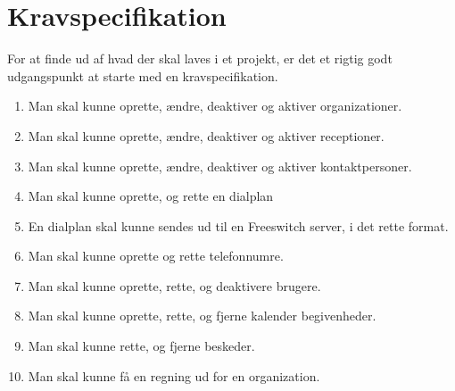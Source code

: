 \section{Kravspecifikation}
For at finde ud af hvad der skal laves i et projekt, er det et rigtig godt udgangspunkt at starte med en kravspecifikation.
\begin{enumerate}
  \item Man skal kunne oprette, ændre, deaktiver og aktiver organizationer.
  \item Man skal kunne oprette, ændre, deaktiver og aktiver receptioner.
  \item Man skal kunne oprette, ændre, deaktiver og aktiver kontaktpersoner.
  \item Man skal kunne oprette, og rette en dialplan
  \item En dialplan skal kunne sendes ud til en Freeswitch server, i det rette format.
  \item Man skal kunne oprette og rette telefonnumre.
  \item Man skal kunne oprette, rette, og deaktivere brugere.
  \item Man skal kunne oprette, rette, og fjerne kalender begivenheder.
  \item Man skal kunne rette, og fjerne beskeder.
  \item Man skal kunne få en regning ud for en organization.
\end{enumerate}
